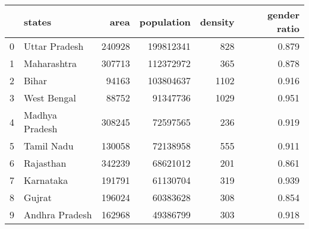 \begin{tabular}{llrrrr}
\toprule
{} &          states &    area &  population &  density &  gender ratio \\
\midrule
0 &   Uttar Pradesh &  240928 &   199812341 &      828 &         0.879 \\
1 &     Maharashtra &  307713 &   112372972 &      365 &         0.878 \\
2 &           Bihar &   94163 &   103804637 &     1102 &         0.916 \\
3 &     West Bengal &   88752 &    91347736 &     1029 &         0.951 \\
4 &  Madhya Pradesh &  308245 &    72597565 &      236 &         0.919 \\
5 &      Tamil Nadu &  130058 &    72138958 &      555 &         0.911 \\
6 &       Rajasthan &  342239 &    68621012 &      201 &         0.861 \\
7 &       Karnataka &  191791 &    61130704 &      319 &         0.939 \\
8 &          Gujrat &  196024 &    60383628 &      308 &         0.854 \\
9 &  Andhra Pradesh &  162968 &    49386799 &      303 &         0.918 \\
\bottomrule
\end{tabular}
